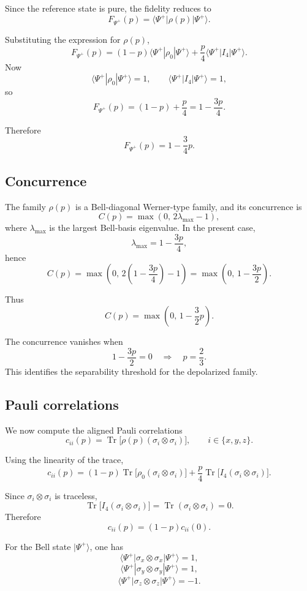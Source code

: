 \documentclass[a4paper]{article}
\begin{document}
Since the reference state is pure, the fidelity reduces to
\[
F_{\Psi^+}(p)
=
\langle\Psi^+|\rho(p)|\Psi^+\rangle.
\]

Substituting the expression for \(\rho(p)\),
\[
F_{\Psi^+}(p)
=
(1-p)\langle\Psi^+|\rho_0|\Psi^+\rangle
+
\frac p4 \langle\Psi^+|I_4|\Psi^+\rangle.
\]
Now
\[
\langle\Psi^+|\rho_0|\Psi^+\rangle = 1,
\qquad
\langle\Psi^+|I_4|\Psi^+\rangle = 1,
\]
so
\[
F_{\Psi^+}(p)
=
(1-p)+\frac p4
=
1-\frac{3p}{4}.
\]

Therefore
\[
F_{\Psi^+}(p)=1-\frac{3}{4}p.
\]

\subsection*{Concurrence}

The family \(\rho(p)\) is a Bell-diagonal Werner-type family, and its concurrence is
\[
C(p)=\max\left(0,\,2\lambda_{\max}-1\right),
\]
where \(\lambda_{\max}\) is the largest Bell-basis eigenvalue. In the present case,
\[
\lambda_{\max}=1-\frac{3p}{4},
\]
hence
\[
C(p)
=
\max\left(0,\,2\left(1-\frac{3p}{4}\right)-1\right)
=
\max\left(0,\,1-\frac{3p}{2}\right).
\]

Thus
\[
C(p)=\max\left(0,\,1-\frac{3}{2}p\right).
\]

The concurrence vanishes when
\[
1-\frac{3p}{2}=0
\quad\Longrightarrow\quad
p=\frac{2}{3}.
\]
This identifies the separability threshold for the depolarized family.

\subsection*{Pauli correlations}

We now compute the aligned Pauli correlations
\[
c_{ii}(p)=\operatorname{Tr}\bigl[\rho(p)(\sigma_i\otimes\sigma_i)\bigr],
\qquad i\in\{x,y,z\}.
\]

Using the linearity of the trace,
\[
c_{ii}(p)
=
(1-p)\operatorname{Tr}\bigl[\rho_0(\sigma_i\otimes\sigma_i)\bigr]
+
\frac p4 \operatorname{Tr}\bigl[I_4(\sigma_i\otimes\sigma_i)\bigr].
\]

Since \(\sigma_i\otimes\sigma_i\) is traceless,
\[
\operatorname{Tr}\bigl[I_4(\sigma_i\otimes\sigma_i)\bigr]
=
\operatorname{Tr}(\sigma_i\otimes\sigma_i)=0.
\]
Therefore
\[
c_{ii}(p)=(1-p)c_{ii}(0).
\]

For the Bell state \(|\Psi^+\rangle\), one has
\[
\langle\Psi^+|\sigma_x\otimes\sigma_x|\Psi^+\rangle = 1,
\]
\[
\langle\Psi^+|\sigma_y\otimes\sigma_y|\Psi^+\rangle = 1,
\]
\[
\langle\Psi^+|\sigma_z\otimes\sigma_z|\Psi^+\rangle = -1.
\]
\end{document}
